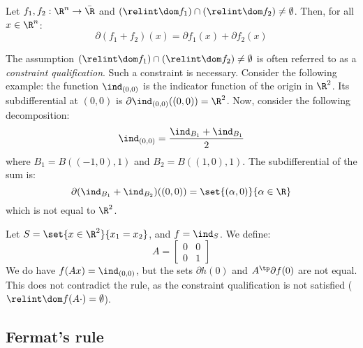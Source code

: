\begin{property}$ $\\
    Let $f_1, f_2:\R^n\to\bar{\R}$ and $(\relint\dom f_1)\cap (\relint\dom f_2)\neq\emptyset$. Then, for all $x\in\R^n$:
    \begin{equation*}
        \partial(f_1+f_2)(x) = \partial f_1(x) + \partial f_2(x)
    \end{equation*}
\end{property}

\begin{remark}
    \label{rm:constraint-qualification}
    The assumption $(\relint\dom f_1)\cap (\relint\dom f_2)\neq\emptyset$ is often referred to as a \emph{constraint qualification}. Such a constraint is necessary. Consider the following example: the function $\ind_{(0,0)}$ is the indicator function of the origin in $\R^2$. Its subdifferential at $(0, 0)$ is $\partial\ind_{(0,0)}((0, 0)) = \R^2$. Now, consider the following decomposition:
    \begin{equation*}
        \ind_{(0, 0)} = \frac{\ind_{B_1} + \ind_{B_1}}{2}
    \end{equation*}
    where $B_1 = B((-1, 0), 1)$ and $B_2 = B((1, 0), 1)$. The subdifferential of the sum is:
    \begin{equation*}
        \partial(\ind_{B_1}+\ind_{B_2})((0, 0)) = \set{(\alpha, 0)}{\alpha\in\R}
    \end{equation*}
    which is not equal to $\R^2$.
\end{remark}

\begin{remark}
    Let $S=\set{x\in\R^2}{x_1=x_2}$, and $f=\ind_S$. We define:
    \begin{equation*}
        A = \begin{bmatrix}
            0 & 0\\
            0 & 1
        \end{bmatrix}
    \end{equation*}
    We do have $f(Ax)=\ind_{(0, 0)}$, but the sets $\partial h(0)$ and $A^\tp\partial f(0)$ are not equal. This does not contradict the rule, as the constraint qualification is not satisfied ($\relint\dom f(A\cdot)=\emptyset$).
\end{remark}

\subsection{Fermat's rule}

